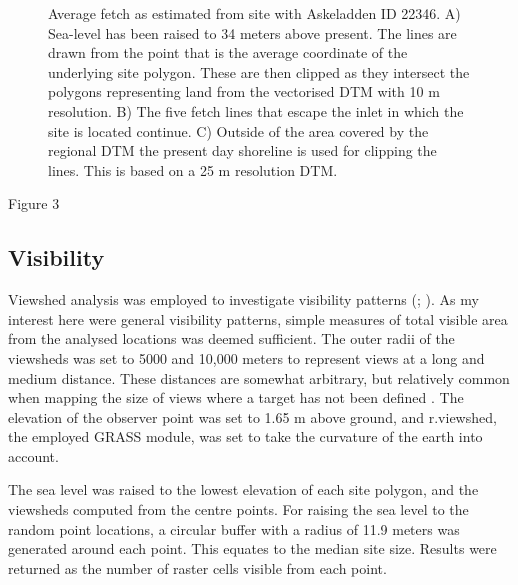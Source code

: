 \documentclass[12pt, a4paper]{article}
\begin{document}
\begin{figure}[!htb]
	\caption{Average fetch as estimated from site with Askeladden ID 22346. A) Sea-level has been raised to 34 meters above present. The lines are drawn from the point that is the average coordinate of the underlying site polygon. These are then clipped as they intersect the polygons representing land from the vectorised DTM with 10 m resolution. B) The five fetch lines that escape the inlet in which the site is located continue. C) Outside of the area covered by the regional DTM the present day shoreline is used for clipping the lines. This is based on a 25 m resolution DTM.}\label{fig:fetch}
\end{figure}

Figure 3

\subsection{Visibility}
Viewshed analysis was employed to investigate visibility patterns (\citealp[][225--233]{conolly2006}; \citealp{gillings2020}). As my interest here were general visibility patterns, simple measures of total visible area from the analysed locations was deemed sufficient. The outer radii of the viewsheds was set to 5000 and 10,000 meters to represent views at a long and medium distance. These distances are somewhat arbitrary, but relatively common when mapping the size of views where a target has not been defined \citep[e.g.][]{lake2000, lopez2008, garcia2013}. The elevation of the observer point was set to 1.65 m above ground, and r.viewshed, the employed GRASS module, was set to take the curvature of the earth into account. \par
The sea level was raised to the lowest elevation of each site polygon, and the viewsheds computed from the centre points. For raising the sea level to the random point locations, a circular buffer with a radius of 11.9 meters was generated around each point. This equates to the median site size. Results were returned as the number of raster cells visible from each point. \par
\end{document}
